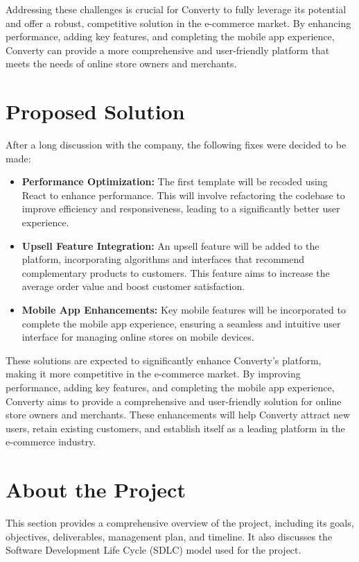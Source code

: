 Addressing these challenges is crucial for Converty to fully leverage its potential and offer a robust, competitive solution in the e-commerce market. By enhancing performance, adding key features, and completing the mobile app experience, Converty can provide a more comprehensive and user-friendly platform that meets the needs of online store owners and merchants.

\section{Proposed Solution}
After a long discussion with the company, the following fixes were decided to be made:

\begin{itemize}
  \item \textbf{Performance Optimization:} The first template will be recoded using React to enhance performance. This will involve refactoring the codebase to improve efficiency and responsiveness, leading to a significantly better user experience.
  \item \textbf{Upsell Feature Integration:} An upsell feature will be added to the platform, incorporating algorithms and interfaces that recommend complementary products to customers. This feature aims to increase the average order value and boost customer satisfaction.
  \item \textbf{Mobile App Enhancements:} Key mobile features will be incorporated to complete the mobile app experience, ensuring a seamless and intuitive user interface for managing online stores on mobile devices.
\end{itemize}

These solutions are expected to significantly enhance Converty's platform, making it more competitive in the e-commerce market. By improving performance, adding key features, and completing the mobile app experience, Converty aims to provide a comprehensive and user-friendly solution for online store owners and merchants. These enhancements will help Converty attract new users, retain existing customers, and establish itself as a leading platform in the e-commerce industry.
\newline

\section{About the Project}
This section provides a comprehensive overview of the project, including its goals, objectives, deliverables, management plan, and timeline. It also discusses the Software Development Life Cycle (SDLC) model used for the project.

